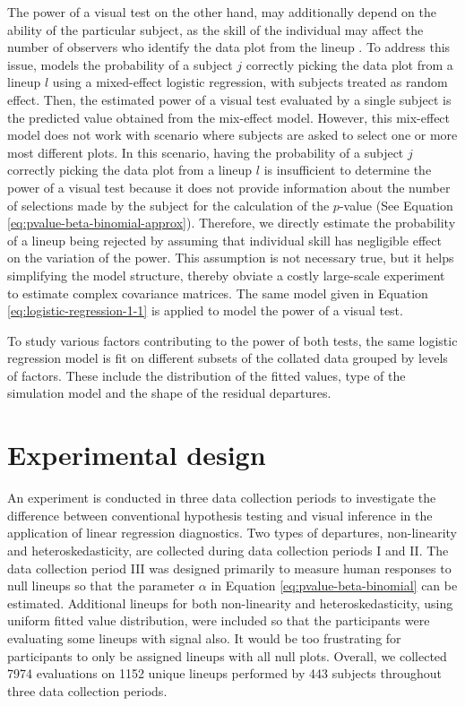 \documentclass[]{interact}
\theoremstyle{plain}%
\theoremstyle{definition}
\theoremstyle{remark}
\begin{document}
The power of a visual test on the other hand, may additionally depend on
the ability of the particular subject, as the skill of the individual
may affect the number of observers who identify the data plot from the
lineup \citep{majumder_validation_2013}. To address this issue,
\citet{majumder_validation_2013} models the probability of a subject
\(j\) correctly picking the data plot from a lineup \(l\) using a
mixed-effect logistic regression, with subjects treated as random
effect. Then, the estimated power of a visual test evaluated by a single
subject is the predicted value obtained from the mix-effect model.
However, this mix-effect model does not work with scenario where
subjects are asked to select one or more most different plots. In this
scenario, having the probability of a subject \(j\) correctly picking
the data plot from a lineup \(l\) is insufficient to determine the power
of a visual test because it does not provide information about the
number of selections made by the subject for the calculation of the
\(p\)-value (See Equation \ref{eq:pvalue-beta-binomial-approx}).
Therefore, we directly estimate the probability of a lineup being
rejected by assuming that individual skill has negligible effect on the
variation of the power. This assumption is not necessary true, but it
helps simplifying the model structure, thereby obviate a costly
large-scale experiment to estimate complex covariance matrices. The same
model given in Equation \ref{eq:logistic-regression-1-1} is applied to
model the power of a visual test.

To study various factors contributing to the power of both tests, the
same logistic regression model is fit on different subsets of the
collated data grouped by levels of factors. These include the
distribution of the fitted values, type of the simulation model and the
shape of the residual departures.

\hypertarget{experimental-design}{%
\section{Experimental design}\label{experimental-design}}

An experiment is conducted in three data collection periods to
investigate the difference between conventional hypothesis testing and
visual inference in the application of linear regression diagnostics.
Two types of departures, non-linearity and heteroskedasticity, are
collected during data collection periods I and II. The data collection
period III was designed primarily to measure human responses to null
lineups so that the parameter \(\alpha\) in Equation
\ref{eq:pvalue-beta-binomial} can be estimated. Additional lineups for
both non-linearity and heteroskedasticity, using uniform fitted value
distribution, were included so that the participants were evaluating
some lineups with signal also. It would be too frustrating for
participants to only be assigned lineups with all null plots. Overall,
we collected 7974 evaluations on 1152 unique lineups performed by 443
subjects throughout three data collection periods.
\end{document}
